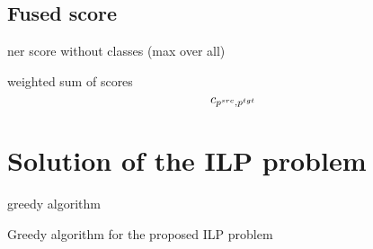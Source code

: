 \subsection{Fused score}

ner score without classes (max over all)

weighted sum of scores
\begin{equation} \label{eq:fused_cost}
    c_{p^{src}, p^{tgt}}
\end{equation}

\section{Solution of the ILP problem}

greedy algorithm
\begin{algorithm}
    \caption{Greedy algorithm for the proposed ILP problem} \label{alg:ilp_greedy}
\end{algorithm}